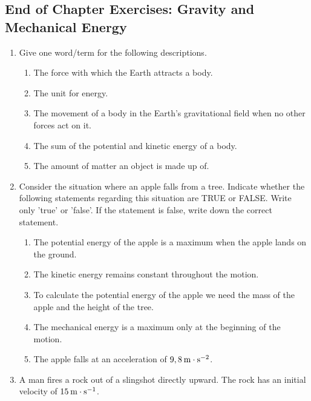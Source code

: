             \subsection{ End of Chapter Exercises: Gravity and Mechanical Energy}
            \nopagebreak
      \label{m38786*id71520}\begin{enumerate}[noitemsep, label=\textbf{\arabic*}. ] 
            \label{m38786*uid118}\item Give one word/term for the following descriptions.
\label{m38786*id71536}\begin{enumerate}[noitemsep, label=\textbf{\alph*}. ] 
            \label{m38786*uid119}\item The force with which the Earth attracts a body.
\label{m38786*uid120}\item The unit for energy.
\label{m38786*uid121}\item The movement of a body in the Earth's gravitational field when no other forces act on it.
\label{m38786*uid122}\item The sum of the potential and kinetic energy of a body.
\label{m38786*uid123}\item The amount of matter an object is made up of.
\end{enumerate}
                \label{m38786*uid124}\item Consider the situation where an apple falls from a tree. Indicate whether the following statements regarding this situation are TRUE or FALSE. Write only 'true' or 'false'. If the statement is false, write down the correct statement.
\label{m38786*id71616}\begin{enumerate}[noitemsep, label=\textbf{\alph*}. ] 
            \label{m38786*uid125}\item The potential energy of the apple is a maximum when the apple lands on the ground.
\label{m38786*uid126}\item The kinetic energy remains constant throughout the motion.
\label{m38786*uid127}\item To calculate the potential energy of the apple we need the mass of the apple and the height of the tree.
\label{m38786*uid128}\item The mechanical energy is a maximum only at the beginning of the motion.
\label{m38786*uid129}\item The apple falls at an acceleration of $9,8\phantom{\rule{2pt}{0ex}}\mathrm{m}\ensuremath{\cdot}\mathrm{s}{}^{-2}$.
\end{enumerate}
                \label{m38786*uid131}\item A man fires a rock out of a slingshot directly upward. The rock has an initial velocity of $15\phantom{\rule{2pt}{0ex}}\mathrm{m}\ensuremath{\cdot}\mathrm{s}{}^{-1}$.

\end{enumerate}
